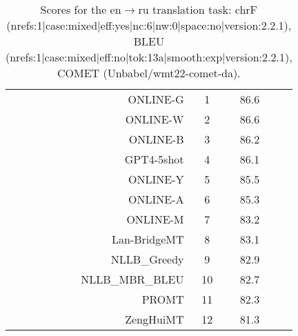 \documentclass[11pt]{article}
\begin{document}
\begin{table}
\begin{subtable}[t]{0.33\textwidth}
\begin{tabular}{rccc}
ONLINE-G & 1 & 86.6 \\ 
ONLINE-W & 2 & 86.6 \\ 
ONLINE-B & 3 & 86.2 \\ 
GPT4-5shot & 4 & 86.1 \\ 
ONLINE-Y & 5 & 85.5 \\ 
ONLINE-A & 6 & 85.3 \\ 
ONLINE-M & 7 & 83.2 \\ 
Lan-BridgeMT & 8 & 83.1 \\ 
NLLB\_Greedy & 9 & 82.9 \\ 
NLLB\_MBR\_BLEU & 10 & 82.7 \\ 
PROMT & 11 & 82.3 \\ 
ZengHuiMT & 12 & 81.3 \\ 
\bottomrule 
\end{tabular} 
\end{subtable} 
\caption{Scores for the en$\rightarrow$ru translation task: chrF (nrefs:1|case:mixed|eff:yes|nc:6|nw:0|space:no|version:2.2.1), BLEU (nrefs:1|case:mixed|eff:no|tok:13a|smooth:exp|version:2.2.1), COMET (Unbabel/wmt22-comet-da).} 
\end{table} 
\end{document}
